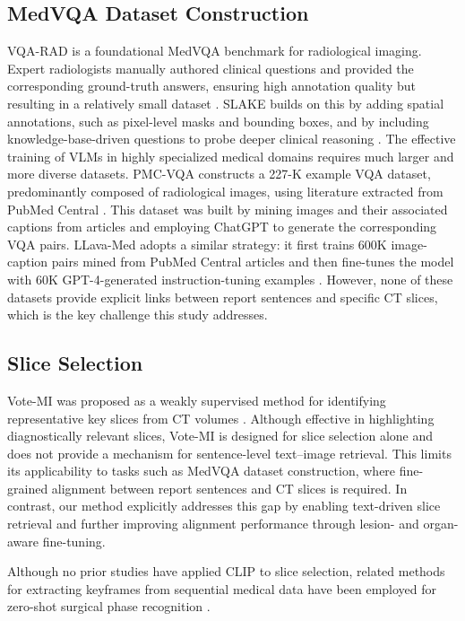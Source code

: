 \documentclass[bioengineering,article,submit,pdftex,moreauthors]{Definitions/mdpi}
\begin{document}
\subsection{MedVQA Dataset Construction}
VQA-RAD is a foundational MedVQA benchmark for radiological imaging. 
Expert radiologists manually authored clinical questions and provided the corresponding ground-truth answers, ensuring high annotation quality but resulting in a relatively small dataset \cite{lau_dataset_2018}. 
SLAKE builds on this by adding spatial annotations, such as pixel-level masks and bounding boxes, and by including knowledge-base-driven questions to probe deeper clinical reasoning \cite{liu_slake_2021}.
The effective training of VLMs in highly specialized medical domains requires much larger and more diverse datasets. 
PMC-VQA constructs a 227-K example VQA dataset, predominantly composed of radiological images, using literature extracted from PubMed Central \cite{zhang_pmc-vqa_2024}.
This dataset was built by mining images and their associated captions from articles and employing ChatGPT to generate the corresponding VQA pairs.
LLava-Med adopts a similar strategy: it first trains 600K image-caption pairs mined from PubMed Central articles and then fine-tunes the model with 60K GPT-4-generated instruction-tuning examples \cite{li_llava-med_2023}.
However, none of these datasets provide explicit links between report sentences and specific CT slices, which is the key challenge this study addresses.

\subsection{Slice Selection}

  Vote-MI was proposed as a weakly supervised method for identifying representative key slices from CT volumes \cite{wang_enhancing_2024}. Although effective in highlighting diagnostically relevant slices, Vote-MI is designed for slice selection alone and does not provide a mechanism for sentence-level text–image retrieval. This limits its applicability to tasks such as MedVQA dataset construction, where fine-grained alignment between report sentences and CT slices is required. In contrast, our method explicitly addresses this gap by enabling text-driven slice retrieval and further improving alignment performance through lesion- and organ-aware fine-tuning.

Although no prior studies have applied CLIP to slice selection, related methods for extracting keyframes from sequential medical data have been employed for zero-shot surgical phase recognition \cite{yuan_hecvl_2025}.
\end{document}
